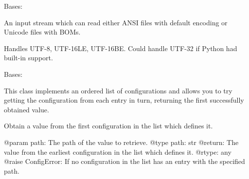 \documentclass[a4paper,10pt,english]{sphinxmanual}
\begin{document}

\begin{fulllineitems}
\label{commands/apidoc/src:src.pyconf.ConfigInputStream}
Bases: 

An input stream which can read either ANSI files with default encoding
or Unicode files with BOMs.

Handles UTF-8, UTF-16LE, UTF-16BE. Could handle UTF-32 if Python had
built-in support.

\begin{fulllineitems}
\label{commands/apidoc/src:src.pyconf.ConfigInputStream.close}
\end{fulllineitems}


\begin{fulllineitems}
\label{commands/apidoc/src:src.pyconf.ConfigInputStream.read}
\end{fulllineitems}


\begin{fulllineitems}
\label{commands/apidoc/src:src.pyconf.ConfigInputStream.readline}
\end{fulllineitems}


\end{fulllineitems}


\begin{fulllineitems}
\label{commands/apidoc/src:src.pyconf.ConfigList}
Bases: 

This class implements an ordered list of configurations and allows you
to try getting the configuration from each entry in turn, returning
the first successfully obtained value.

\begin{fulllineitems}
\label{commands/apidoc/src:src.pyconf.ConfigList.getByPath}
Obtain a value from the first configuration in the list which defines
it.

@param path: The path of the value to retrieve.
@type path: str
@return: The value from the earliest configuration in the list which
defines it.
@rtype: any
@raise ConfigError: If no configuration in the list has an entry with
the specified path.

\end{fulllineitems}


\end{fulllineitems}
\end{document}
